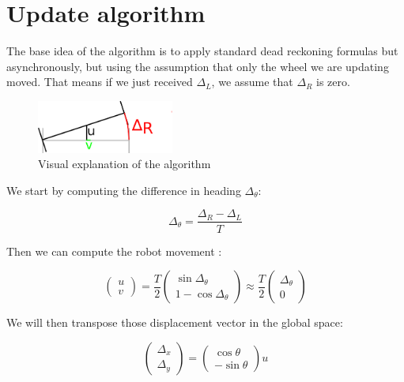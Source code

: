 \documentclass[a4paper]{IEEEtran}
\begin{document}
\section{Update algorithm}
The base idea of the algorithm is to apply standard dead reckoning formulas but asynchronously, but using the assumption that only the wheel we are updating moved.
That means if we just received $\Delta_L$, we assume that $\Delta_R$ is zero.

\begin{figure}[h]
    \begin{center}
        \includegraphics[width=0.4\textwidth]{algorithm.png}
        \caption{Visual explanation of the algorithm}
    \end{center}
\end{figure}

We start by computing the difference in heading $\Delta_\theta$:

\begin{equation}
    \Delta_\theta = \frac{\Delta_R - \Delta_L}{T}
\end{equation}

Then we can compute the robot movement :

\begin{equation}
    \begin{pmatrix}
        u\\v
    \end{pmatrix}  
    =
    \frac{T}{2}
    \begin{pmatrix}
        \sin \Delta_\theta\\1 - \cos \Delta_\theta
    \end{pmatrix}
    \approx
    \frac{T}{2}
    \begin{pmatrix}
        \Delta_\theta\\ 0
    \end{pmatrix}
\end{equation}

We will then transpose those displacement vector in the global space:

\begin{equation}
    \begin{pmatrix}
        \Delta_x\\\Delta_y
    \end{pmatrix}
    =
    \begin{pmatrix}
        \cos\theta \\-\sin\theta
    \end{pmatrix}
    u 
\end{equation}
\end{document}
